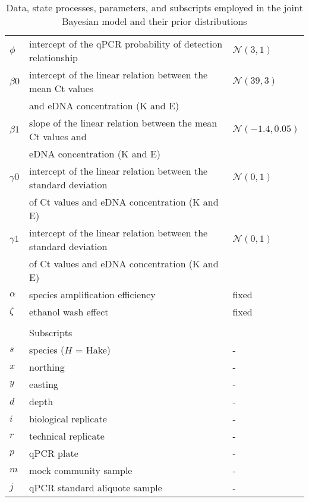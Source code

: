 \documentclass{article}
\begin{document}
\begin{table}[h]
\begin{tabular}{lll}
$\phi$& intercept of the qPCR probability of detection relationship & $\mathcal{N}(3,1)$\\
$\beta0$& intercept of the linear relation between the mean Ct values&$\mathcal{N}(39,3)$\\
&and eDNA concentration (K and E) & \\
$\beta1$& slope of the linear relation between the mean Ct values and &$\mathcal{N}(-1.4,0.05)$\\
&eDNA concentration (K and E) & \\
$\gamma0$& intercept of the linear relation between the standard deviation&$\mathcal{N}(0,1)$\\
&of Ct values and eDNA concentration (K and E) & \\
$\gamma1$& intercept of the linear relation between the standard deviation &$\mathcal{N}(0,1)$\\
&of Ct values and eDNA concentration (K and E) & \\
$\alpha$& species amplification efficiency & fixed\\
$\zeta$& ethanol wash effect & fixed\\
&&\\
&Subscripts&\\
\hline
$s$& species ($H$ = Hake) & -\\
$x$& northing & -\\
$y$& easting & -\\
$d$& depth & -\\
$i$& biological replicate & -\\
$r$& technical replicate & -\\
$p$& qPCR plate & -\\
$m$& mock community sample & -\\
$j$& qPCR standard aliquote sample & -\\


    \end{tabular}
    \caption{Data, state processes, parameters, and subscripts employed in the joint Bayesian model and their prior distributions}
    \label{tab:filter_error}
\end{table}
\end{document}
